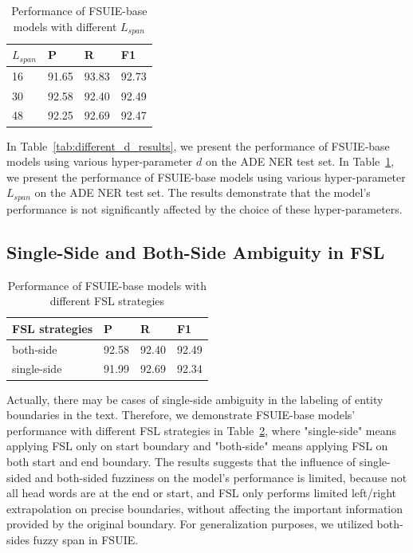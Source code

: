 \documentclass[11pt]{article}
\begin{document}
\begin{table}[!ht]
    \centering
    \small
    \begin{tabular}{llll}
        \toprule
        \textbf{$L_{span}$} & \textbf{P} & \textbf{R} & \textbf{F1 } \\ 
        \midrule
        16 & 91.65 & 93.83 & 92.73  \\ 
        30 & 92.58 & 92.40 & 92.49  \\ 
        48 & 92.25 & 92.69 & 92.47  \\ 
        \bottomrule
    \end{tabular}
    \caption{Performance of FSUIE-base models with different $L_{span}$}
    \label{tab:different_Lspan_results}
\end{table}

In Table~\ref{tab:different_d_results}, we present the performance of FSUIE-base models using various hyper-parameter $d$ on the ADE NER test set.
In Table~\ref{tab:different_Lspan_results}, we present the performance of FSUIE-base models using various hyper-parameter $L_{span}$ on the ADE NER test set.
The results demonstrate  that the model's performance is not significantly affected by the choice of these hyper-parameters.



\subsection{Single-Side and Both-Side Ambiguity in FSL}

\begin{table}[!ht]
    \centering
    \small
    \begin{tabular}{llll}
        \toprule
        \textbf{FSL strategies} & \textbf{P} & \textbf{R} & \textbf{F1 } \\ 
        \midrule
        both-side & 92.58 & 92.40 & 92.49  \\ 
        single-side & 91.99 & 92.69 & 92.34  \\ 
        \bottomrule
    \end{tabular}
    \caption{Performance of FSUIE-base models with different FSL strategies}
    \label{tab:different_side_results}
\end{table}

Actually, there may be cases of single-side ambiguity in the labeling of entity boundaries in the text. 
Therefore, we demonstrate FSUIE-base models' performance with different FSL strategies in Table~\ref{tab:different_side_results}, where "single-side" means applying FSL only on start boundary and "both-side" means applying FSL on both start and end boundary.
The results suggests that the influence of single-sided and both-sided fuzziness on the model's performance is limited, because not all head words are at the end or start, and FSL only performs limited left/right extrapolation on precise boundaries, without affecting the important information provided by the original boundary. For generalization purposes, we utilized both-sides fuzzy span in FSUIE.
\end{document}
